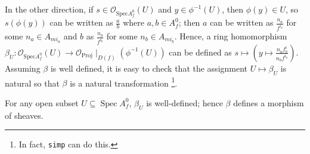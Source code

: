 \documentclass[a4paper,UKenglish,cleveref, autoref, thm-restate]{lipics-v2021}
\begin{document}
In the other direction, if $s\in \mathcal O_{\mathrm{Spec}A^0_f}(U)$ and $y\in \phi^{-1}(U)$, then $\phi(y)\in U$, so $s(\phi(y))$ can be written as $\frac{a}{b}$ where $a,b\in A^0_f$; then $a$ can be written as $\frac{n_a}{f^{i_a}}$ for some $n_a\in A_{mi_a}$ and $b$ as $\frac{n_b}{f^{i_b}}$ for some $n_b\in A_{mi_b}$. Hence, a ring homomorphism $\beta_U: \mathcal O_{\mathrm{Spec}A^0_f}(U)\to \mathcal O_{\mathrm{Proj}}\!\mid_{D(f)}(\phi^{-1}(U))$ can be defined as $s\mapsto \left(y \mapsto \frac{n_af^i_b}{n_bf^{i_a}}\right)$. Assuming $\beta$ is well defined, it is easy to check that the assignment $U\mapsto \beta_U$ is natural so that $\beta$ is a natural transformation \footnote{In fact, \lstinline{simp} can do this.}.

\begin{lemma}\label{thm:def-beta}
    For any open subset $U\subseteq \operatorname{Spec}A^0_f$, $\beta_U$ is well-defined; hence $\beta$ defines a morphism of sheaves.
\end{lemma}
\end{document}

